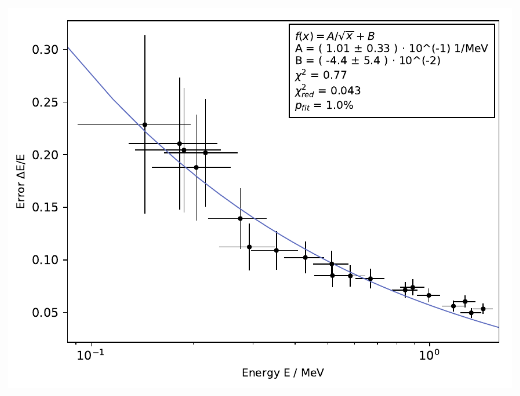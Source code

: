     \begin{center}
        \captionsetup{type=figure}
        \begin{adjustbox}{max width=\linewidth, keepaspectratio}
            \includegraphics[]{pdf/energy_resolution}
        \end{adjustbox}
        \label{fig:EnergyResolution}
    \end{center}
\endminipage
%
